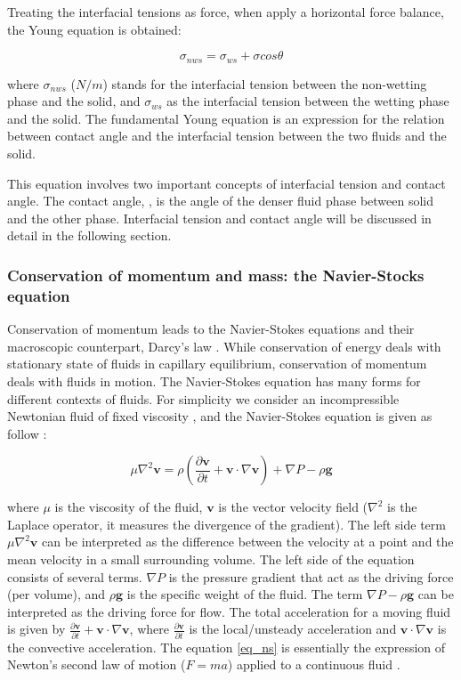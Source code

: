 Treating the interfacial tensions as force, when apply a horizontal force balance, the Young equation is obtained:

\begin{equation}\label{eq_young}
    \sigma_{nws}=\sigma_{ws}+\sigma cos \theta
\end{equation}

where $ \sigma_{nws}$ ($N/m$) stands for the interfacial tension between the non-wetting phase and the solid, and $ \sigma_{ws}$ as the interfacial tension between the wetting phase and the solid. The fundamental Young equation is an expression for the relation between contact angle and the interfacial tension between the two fluids and the solid.

This equation involves two important concepts of interfacial tension and contact angle. The contact angle, \texttheta, is the angle of the denser fluid phase between solid and the other phase. Interfacial tension and contact angle will be discussed in detail in the following section.

\subsubsection{Conservation of momentum and mass: the Navier-Stocks equation}
Conservation of momentum leads to the Navier-Stokes equations and their macroscopic counterpart, Darcy's law \citep{darcy1856public}. While conservation of energy deals with stationary state of fluids in capillary equilibrium, conservation of momentum deals with fluids in motion. The Navier-Stokes equation has many forms for different contexts of fluids. For simplicity we consider an incompressible Newtonian fluid of fixed viscosity \textmu , and the Navier-Stokes equation is given as follow \citep{batchelor1967introduction}:

\begin{equation}\label{eq_ns}
    \mu\nabla^{2} \mathbf{v} =\rho(\frac{\partial \mathbf{v}}{\partial t}+\mathbf{v}\cdot \nabla \mathbf{v})+\nabla P -\rho\mathbf{g}
\end{equation}

where $\mu$ is the viscosity of the fluid, $\mathbf{v}$ is the vector velocity field ($\nabla^2$ is the Laplace operator, it measures the divergence of the gradient). The left side term $\mu \nabla^2 \mathbf{v}$ can be interpreted as the difference between the velocity at a point and the mean velocity in a small surrounding volume. The left side of the equation consists of several terms. $\nabla P$ is the pressure gradient that act as the driving force (per volume), and $\rho\mathbf{g}$ is the specific weight of the fluid. The term $\nabla P - \rho\mathbf{g}$ can be interpreted as the driving force for flow. The total acceleration  for a moving fluid is given by $\frac{\partial \mathbf{v}}{\partial t} + \mathbf{v}\cdot \nabla \mathbf{v}$, where $\frac{\partial \mathbf{v}}{\partial t}$ is the local/unsteady acceleration and $\mathbf{v}\cdot \nabla \mathbf{v}$ is the convective acceleration. The equation \ref{eq_ns} is essentially the expression of Newton's second law of motion ($F=ma$) applied to a continuous fluid \citep{blunt2017multiphase}. 

